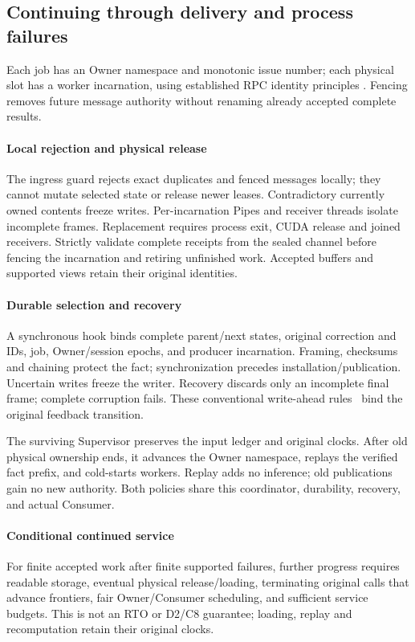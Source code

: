 \subsection{Continuing through delivery and process failures}
\label{subsec:native_resilience}
Each job has an Owner namespace and monotonic issue number; each physical
slot has a worker incarnation, using established RPC identity principles
\cite{birrell1984rpc}. Fencing removes future message authority without
renaming already accepted complete results.

\paragraph{Local rejection and physical release}
The ingress guard rejects exact duplicates and fenced messages locally;
they cannot mutate selected state or release newer leases. Contradictory
currently owned contents freeze writes. Per-incarnation Pipes and receiver
threads isolate incomplete frames. Replacement requires process exit,
CUDA release and joined receivers. Strictly validate complete receipts
from the sealed channel before fencing the incarnation and retiring
unfinished work. Accepted buffers and supported views retain their
original identities.

\paragraph{Durable selection and recovery}
A synchronous hook binds complete parent/next states, original correction
and IDs, job, Owner/session epochs, and producer incarnation. Framing,
checksums and chaining protect the fact; synchronization precedes
installation/publication. Uncertain writes freeze the writer. Recovery
discards only an incomplete final frame; complete corruption fails.
These conventional write-ahead rules~\cite{mohan1992aries} bind the
original feedback transition.

The surviving Supervisor preserves the input ledger and original clocks.
After old physical ownership ends, it advances the Owner namespace,
replays the verified fact prefix, and cold-starts workers. Replay adds no
inference; old publications gain no new authority. Both policies share
this coordinator, durability, recovery, and actual Consumer.

\paragraph{Conditional continued service}
\label{prop:continued_service}
For finite accepted work after finite supported failures, further progress
requires readable storage, eventual physical release/loading, terminating
original calls that advance frontiers, fair Owner/Consumer scheduling,
and sufficient service budgets. This is not an RTO or D2/C8 guarantee;
loading, replay and recomputation retain their original clocks.

